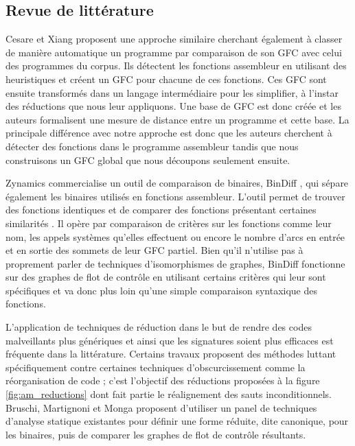 \FloatBarrier
\subsection{Revue de littérature}
Cesare et Xiang \cite{CX10} proposent une approche similaire cherchant également à classer de manière automatique un programme par comparaison de son GFC avec celui des programmes du corpus.
Ils détectent les fonctions assembleur en utilisant des heuristiques et créent un GFC pour chacune de ces fonctions.
Ces GFC sont ensuite transformés dans un langage intermédiaire pour les simplifier, à l'instar des réductions que nous leur appliquons.
Une base de GFC est donc créée et les auteurs formalisent une mesure de distance entre un programme et cette base.
La principale différence avec notre approche est donc que les auteurs cherchent à détecter des fonctions dans le programme assembleur tandis que nous construisons un GFC global que nous découpons seulement ensuite.

Zynamics commercialise un outil de comparaison de binaires, BinDiff \cite{bindiff}, qui sépare également les binaires utilisés en fonctions assembleur.
L'outil permet de trouver des fonctions identiques et de comparer des fonctions présentant certaines similarités \cite{DR05}.
Il opère par comparaison de critères sur les fonctions comme leur nom, les appels systèmes qu'elles effectuent ou encore le nombre d'arcs en entrée et en sortie des sommets de leur GFC partiel. Bien qu'il n'utilise pas à proprement parler de techniques d'isomorphismes de graphes, BinDiff fonctionne sur des graphes de flot de contrôle en utilisant certains critères qui leur sont spécifiques et va donc plus loin qu'une simple comparaison syntaxique des fonctions.

L'application de techniques de réduction dans le but de rendre des codes malveillants plus génériques et ainsi que les signatures soient plus efficaces est fréquente dans la littérature. 
Certains travaux \cite{CKJKVM05} proposent des méthodes luttant spécifiquement contre certaines techniques d'obscurcissement comme la réorganisation de code ; c'est l'objectif des réductions proposées à la figure \ref{fig:am_reductions} dont fait partie le réalignement des sauts inconditionnels.
Bruschi, Martignoni et Monga \cite{BMM06} proposent d'utiliser un panel de techniques d'analyse statique existantes pour définir une forme réduite, dite canonique, pour les binaires, puis de comparer les graphes de flot de contrôle résultants.

